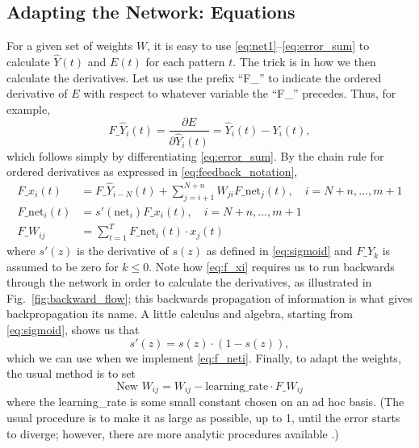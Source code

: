 \documentclass[journal]{IEEEtran} %
\begin{document}
\subsection{Adapting the Network: Equations}
For a given set of weights $W$, it is easy to use \eqref{eq:net1}--\eqref{eq:error_sum} to calculate $\hat{Y}(t)$ and $E(t)$ for each pattern $t$. The trick is in how we then calculate the derivatives.
Let us use the prefix ``F\_'' to indicate the ordered derivative of $E$ with respect to whatever variable the ``F\_'' precedes. Thus, for example,
\begin{equation}
    F\_\hat{Y}_i(t) = \frac{\partial E}{\partial \hat{Y}_i(t)} = \hat{Y}_i(t) - Y_i(t), \label{eq:f_yhat}
\end{equation}
which follows simply by differentiating \eqref{eq:error_sum}. By the chain rule for ordered derivatives as expressed in \eqref{eq:feedback_notation},
\begin{align}
    F\_x_i(t) &= F\_\hat{Y}_{i-N}(t) + \sum_{j=i+1}^{N+n} W_{ji} F\_\text{net}_j(t), \quad i=N+n, \dots, m+1 \label{eq:f_xi} \\
    F\_\text{net}_i(t) &= s'(\text{net}_i) F\_x_i(t), \quad i=N+n, \dots, m+1 \label{eq:f_neti} \\
    F\_W_{ij} &= \sum_{t=1}^T F\_\text{net}_i(t) \cdot x_j(t) \label{eq:f_wij}
\end{align}
where $s'(z)$ is the derivative of $s(z)$ as defined in \eqref{eq:sigmoid} and $F\_Y_k$ is assumed to be zero for $k \le 0$. Note how \eqref{eq:f_xi} requires us to run backwards through the network in order to calculate the derivatives, as illustrated in Fig.~\ref{fig:backward_flow}; this backwards propagation of information is what gives backpropagation its name. A little calculus and algebra, starting from \eqref{eq:sigmoid}, shows us that
\begin{equation}
    s'(z) = s(z) \cdot (1 - s(z)), \label{eq:s_prime}
\end{equation}
which we can use when we implement \eqref{eq:f_neti}. Finally, to adapt the weights, the usual method is to set
\begin{equation}
    \text{New } W_{ij} = W_{ij} - \text{learning\_rate} \cdot F\_W_{ij} \label{eq:weight_update}
\end{equation}
where the learning\_rate is some small constant chosen on an ad hoc basis. (The usual procedure is to make it as large as possible, up to 1, until the error starts to diverge; however, there are more analytic procedures available \cite{Werbos:1987b}.)
\end{document}
